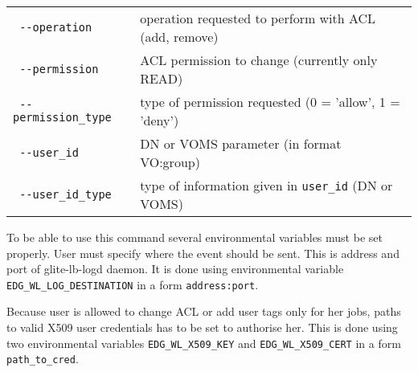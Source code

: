\begin{tabularx}{\textwidth}{lX}
\texttt{      -{}-operation} &       operation requested to perform with ACL (add, remove)\\
\texttt{      -{}-permission} &      ACL permission to change (currently only READ)\\
\texttt{      -{}-permission\_type} & type of permission requested (0 = 'allow', 1 = 'deny')\\
\texttt{      -{}-user\_id} &         DN or VOMS parameter (in format VO:group)\\
\texttt{      -{}-user\_id\_type} &    type of information given in \verb'user_id' (DN or VOMS)\\
\end{tabularx}

\bigskip

To be able to use this command several environmental variables must be set properly. User must specify where the event should be sent. This is address and port of glite-lb-logd daemon. It is done using environmental variable \verb'EDG_WL_LOG_DESTINATION' in a form \verb'address:port'.

Because user is allowed to change ACL or add user tags only for her jobs, paths to valid X509 user credentials has to be set to authorise her. This is done using two environmental variables \verb'EDG_WL_X509_KEY' and \verb'EDG_WL_X509_CERT' in a form \verb'path_to_cred'.

